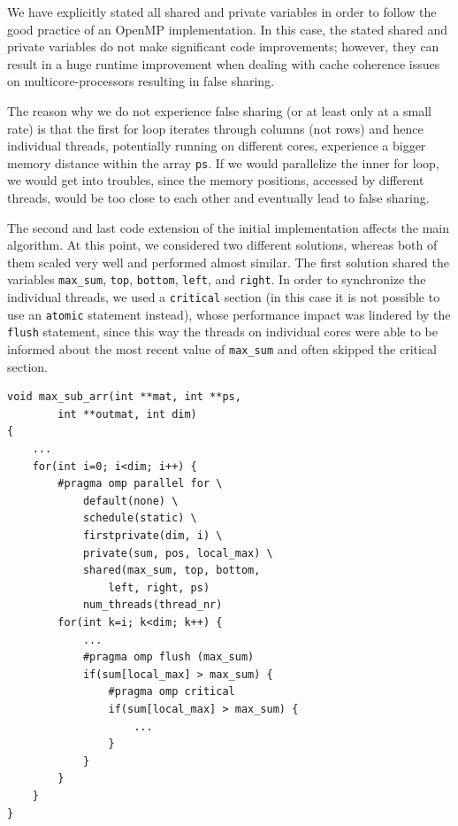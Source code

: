 \documentclass[conference]{IEEEtran}
\begin{document}
We have explicitly stated all shared and private variables in order to follow the good practice of an OpenMP implementation. In this case, the stated shared and private variables do not make significant code improvements; however, they can result in a huge runtime improvement when dealing with cache coherence issues on multicore-processors resulting in false sharing. 

The reason why we do not experience false sharing (or at least only at a small rate) is that the first for loop iterates through columns (not rows) and hence individual threads, potentially running on different cores, experience a bigger memory distance within the array \texttt{ps}. If we would parallelize the inner for loop, we would get into troubles, since the memory positions, accessed by different threads, would be too close to each other and eventually lead to false sharing. 

The second and last code extension of the initial implementation affects the main algorithm. At this point, we considered two different solutions, whereas both of them scaled very well and performed almost similar. The first solution shared the variables \texttt{max\_sum}, \texttt{top}, \texttt{bottom}, \texttt{left}, and \texttt{right}. In order to synchronize the individual threads, we used a \texttt{critical} section (in this case it is not possible to use an \texttt{atomic} statement instead), whose performance impact was lindered by the \texttt{flush} statement, since this way the threads on individual cores were able to be informed about the most recent value of \texttt{max\_sum} and often skipped the critical section. 


\begin{center}
   \begin{lstlisting}[captionpos=b, caption=OpenMP: Parallel Main Algorithm, label=lst:alg]  
void max_sub_arr(int **mat, int **ps, 
        int **outmat, int dim)                                                   
{                                                              
    ... 
    for(int i=0; i<dim; i++) {
        #pragma omp parallel for \
            default(none) \
            schedule(static) \
            firstprivate(dim, i) \
            private(sum, pos, local_max) \
            shared(max_sum, top, bottom, 
                left, right, ps)
            num_threads(thread_nr)
        for(int k=i; k<dim; k++) { 
            ...
            #pragma omp flush (max_sum)       
            if(sum[local_max] > max_sum) {    
                #pragma omp critical          
                if(sum[local_max] > max_sum) {
                    ...
                }
            }              
        }
    }
}
   \end{lstlisting}
\end{center}	
\end{document}
